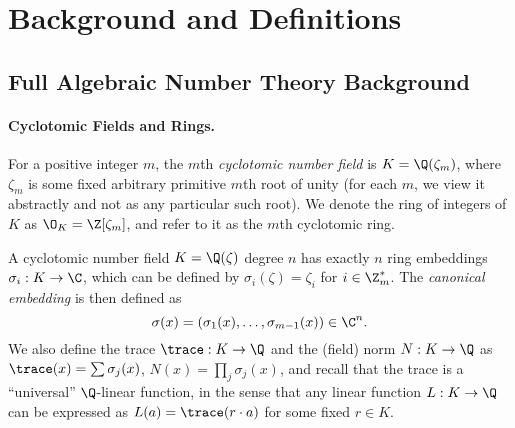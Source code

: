\iflncs\section{Background and Definitions}
\label{sec:backgr-defin}
\fi


\subsection{Full Algebraic Number Theory Background}
\label{sec:algebr-numb-theory}



\paragraph{Cyclotomic Fields and Rings.}
For a positive integer $m$, the $m$th
\emph{cyclotomic number field} is $K=\Q(\zeta_{m})$, where $\zeta_m$ is some fixed arbitrary primitive $m$th root of unity (for each $m$,
we view it abstractly and not as any particular such root).  We denote
the ring of integers of $K$ as $\O_{K} = \Z[\zeta_{m}]$, and refer to
it as the $m$th cyclotomic ring. 

A cyclotomic number field
$K=\Q(\zeta)$ degree $n$ has exactly $n$ ring embeddings $\sigma_i: K
\to \C$, which can be defined by $\sigma_i(\zeta)=\zeta_i$ for $i \in
\Z_m^*$. The \emph{canonical embedding} is then defined as \[\sigma(x)
= (\sigma_1(x), \ldots, \sigma_{m-1}(x)) \in \C^{n}.\] We also define
the trace $\trace: K \to \Q$ and the (field) norm $N: K \to \Q$ as
$\trace(x)=\sum \sigma_j(x)$, $N(x)=\prod_{j}\sigma_j(x)$, and recall
that the trace is a ``universal'' $\Q$-linear function, in the sense
that  any linear function $L: K \to \Q$ can be expressed as
$L(a)=\trace(r\cdot a)$ for some fixed $r \in K$. 



